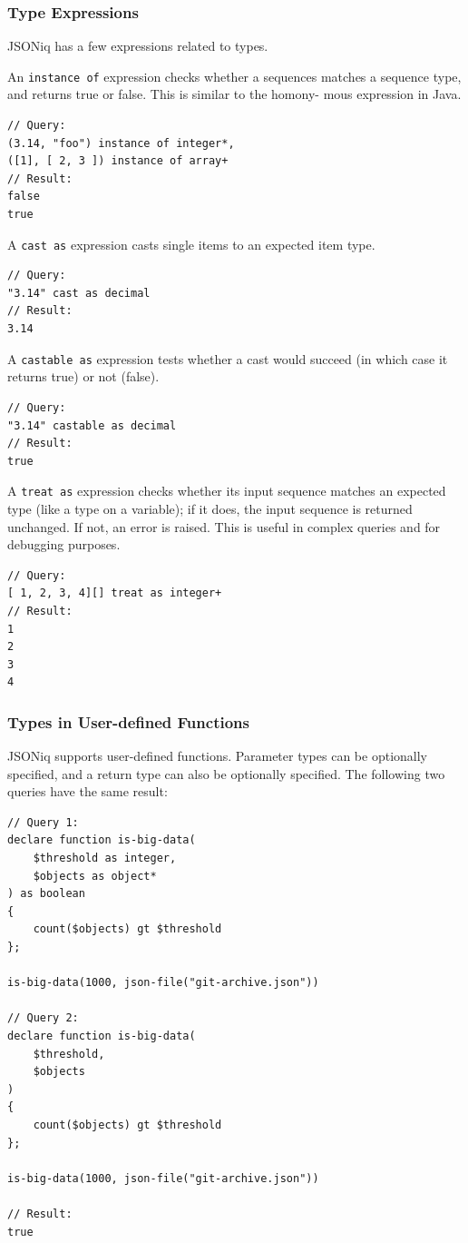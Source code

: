 \subsubsection{Type Expressions}
JSONiq has a few expressions related to types.

An \texttt{instance of} expression checks whether a sequences matches a
sequence type, and returns true or false. This is similar to the homony- mous expression in Java.

\begin{lstlisting}[style=json]
// Query:
(3.14, "foo") instance of integer*,
([1], [ 2, 3 ]) instance of array+
// Result:
false
true  
\end{lstlisting}

A \texttt{cast as} expression casts single items to an expected item type.

\begin{lstlisting}[style=json]
// Query:
"3.14" cast as decimal
// Result:
3.14
\end{lstlisting}

A \texttt{castable as} expression tests whether a cast would succeed (in which case it returns true) or not (false).

\begin{lstlisting}[style=json]
// Query:
"3.14" castable as decimal
// Result:
true
\end{lstlisting}

A \texttt{treat as} expression checks whether its input sequence matches an expected type (like a type on a variable); if it does, the input sequence is returned unchanged. If not, an error is raised. This is useful in complex queries and for debugging purposes.

\begin{lstlisting}[style=json]
// Query:
[ 1, 2, 3, 4][] treat as integer+
// Result:
1
2
3
4
\end{lstlisting}

\subsubsection{Types in User-defined Functions}
JSONiq supports user-defined functions. Parameter types can be optionally specified, and a return type can also be optionally specified. The following two queries have the same result:

\begin{lstlisting}[style=json]
// Query 1:
declare function is-big-data(
    $threshold as integer,
    $objects as object*
) as boolean
{
    count($objects) gt $threshold
};

is-big-data(1000, json-file("git-archive.json"))

// Query 2:
declare function is-big-data(
    $threshold,
    $objects
)
{
    count($objects) gt $threshold
};

is-big-data(1000, json-file("git-archive.json"))

// Result:
true
\end{lstlisting}

